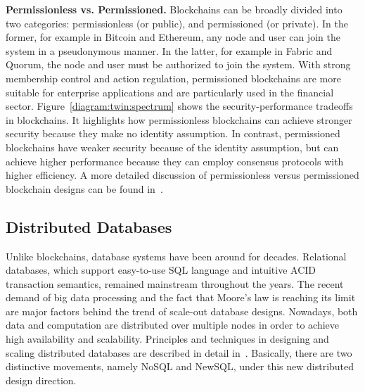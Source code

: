 \textbf{Permissionless vs. Permissioned.} Blockchains can be broadly divided
into two categories: permissionless (or public), and permissioned (or private).
In the former, for example in Bitcoin and Ethereum, any node and user can join
the system in a pseudonymous manner. In the latter, for example in Fabric and
Quorum, the node and user must be authorized to join the system. With strong
membership control and action regulation, permissioned blockchains are more
suitable for enterprise applications and are particularly used in the financial
sector.
Figure~\ref{diagram:twin:spectrum} shows the security-performance tradeoffs in
blockchains. It highlights how permissionless blockchains can achieve stronger
security because they make no identity assumption. In contrast, permissioned
blockchains have weaker security because of the identity assumption, but can
achieve higher performance because they can employ consensus protocols with
higher efficiency. A more detailed discussion of permissionless versus
permissioned blockchain designs can be found
in~\cite{dinh2018untangling,dinh2017blockbench}.

\subsection{Distributed Databases}

Unlike blockchains, database systems have been around for decades.  Relational
databases, which support easy-to-use SQL language and intuitive ACID transaction
semantics, remained mainstream throughout the years. The recent demand of big
data processing and the fact that Moore's law is reaching its limit are major
factors behind the trend of scale-out database designs. Nowadays, both data and
computation are distributed over multiple nodes in order to achieve high
availability and scalability. Principles and techniques in designing and scaling
distributed databases are described in detail in~\cite{ozsu2011principles}.
Basically, there are two distinctive movements, namely NoSQL and NewSQL, under
this new distributed design direction.


